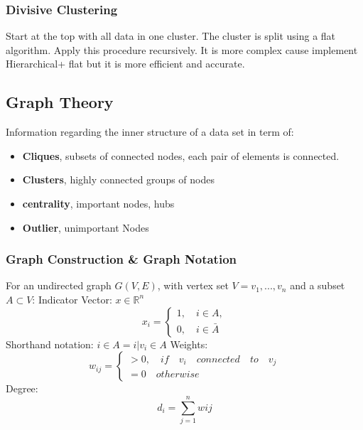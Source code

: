 \documentclass[unicode,11pt,a4paper,oneside,numbers=endperiod,openany]{scrartcl}
\begin{document}
\subsubsection{Divisive Clustering}
Start at the top with all data in one cluster. The cluster is split using a flat algorithm. Apply this procedure recursively. It is more complex cause implement Hierarchical+ flat but it is more efficient and accurate.


\subsection{Graph Theory}
Information regarding the inner structure of a data set in term of:
\begin{itemize}
 \item {\textbf{Cliques}, subsets of connected nodes, each pair of elements is connected.}
 \item{\textbf{Clusters}, highly connected groups of nodes}
 \item{\textbf{centrality}, important nodes, hubs}
 \item{\textbf{Outlier}, unimportant Nodes}
\end{itemize}

\subsubsection{Graph Construction \& Graph Notation}
For an undirected graph $G(V,E)$, with vertex set $V = {v_1,...,v_n}$ and a subset $A \subset V$:\newline \newline
Indicator Vector: $x \in \mathbb{R}^n$
\begin{equation}
         x_i =
         \begin{cases}
          1, \quad i \in A, \\
          0, \quad i \in \bar{A}
          \end{cases}
         \end{equation}
Shorthand notation: $i \in A = {i|v_i \in A}$
\newline
Weights:
\begin{equation}
 w_{ij} = \begin{cases}
           >0, \quad if\quad v_i\quad   connected \quad to \quad v_j \\
           = 0 \quad otherwise
          \end{cases}
\end{equation}
Degree:\newline
\[
 d_i = \sum^n_{j=1}w{ij}
\]
\end{document}
